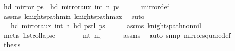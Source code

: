 \begin{isabellebody}
\ {\isachardoublequoteopen}hd\ {\isacharparenleft}{\kern0pt}mirror{}\ ps{\isacharparenright}{\kern0pt}\ {\isacharequal}{\kern0pt}\ hd\ {\isacharparenleft}{\kern0pt}mirror{}{\isacharunderscore}{\kern0pt}aux\ {\isacharparenleft}{\kern0pt}int\ n{\isacharplus}{\kern0pt}{}{\isacharparenright}{\kern0pt}\ ps{\isacharparenright}{\kern0pt}{\isachardoublequoteclose}\isanewline
\ \ \ \ \isamarkupfalse%
\ mirror{}{\isacharunderscore}{\kern0pt}def\ \isamarkupfalse%
\ assms\ knights{\isacharunderscore}{\kern0pt}path{\isacharunderscore}{\kern0pt}min{}\ knights{\isacharunderscore}{\kern0pt}path{\isacharunderscore}{\kern0pt}max{}\ \isamarkupfalse%
\ auto\isanewline
\ \ \isamarkupfalse%
\ \isamarkupfalse%
\ {\isachardoublequoteopen}{\isachardot}{\kern0pt}{\isachardot}{\kern0pt}{\isachardot}{\kern0pt}\ {\isacharequal}{\kern0pt}\ hd\ {\isacharparenleft}{\kern0pt}mirror{}{\isacharunderscore}{\kern0pt}aux\ {\isacharparenleft}{\kern0pt}int\ n{\isacharplus}{\kern0pt}{}{\isacharparenright}{\kern0pt}\ {\isacharparenleft}{\kern0pt}{\isacharparenleft}{\kern0pt}hd\ ps{\isacharparenright}{\kern0pt}{\isacharhash}{\kern0pt}{\isacharparenleft}{\kern0pt}tl\ ps{\isacharparenright}{\kern0pt}{\isacharparenright}{\kern0pt}{\isacharparenright}{\kern0pt}{\isachardoublequoteclose}\isanewline
\ \ \ \ \isamarkupfalse%
\ assms\ knights{\isacharunderscore}{\kern0pt}path{\isacharunderscore}{\kern0pt}non{\isacharunderscore}{\kern0pt}nil\ \isamarkupfalse%
\ {\isacharparenleft}{\kern0pt}metis\ list{\isachardot}{\kern0pt}collapse{\isacharparenright}{\kern0pt}\isanewline
\ \ \isamarkupfalse%
\ \isamarkupfalse%
\ {\isachardoublequoteopen}{\isachardot}{\kern0pt}{\isachardot}{\kern0pt}{\isachardot}{\kern0pt}\ {\isacharequal}{\kern0pt}\ {\isacharparenleft}{\kern0pt}int\ n{\isacharplus}{\kern0pt}{}{\isacharminus}{\kern0pt}i{\isacharcomma}{\kern0pt}j{\isacharparenright}{\kern0pt}{\isachardoublequoteclose}\isanewline
\ \ \ \ \isamarkupfalse%
\ assms\ \isamarkupfalse%
\ {\isacharparenleft}{\kern0pt}auto\ simp{\isacharcolon}{\kern0pt}\ mirror{}{\isacharunderscore}{\kern0pt}square{\isacharunderscore}{\kern0pt}def{\isacharparenright}{\kern0pt}\isanewline
\ \ \isamarkupfalse%
\ \isamarkupfalse%
\ {\isacharquery}{\kern0pt}thesis\ \isacommand{{\isachardot}{\kern0pt}}\isamarkupfalse%

\end{isabellebody}
